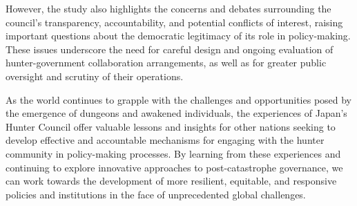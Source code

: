 \documentclass[12pt, a4paper]{article}
\begin{document}
However, the study also highlights the concerns and debates surrounding the council's transparency, accountability, and potential conflicts of interest, raising important questions about the democratic legitimacy of its role in policy-making. These issues underscore the need for careful design and ongoing evaluation of hunter-government collaboration arrangements, as well as for greater public oversight and scrutiny of their operations.

As the world continues to grapple with the challenges and opportunities posed by the emergence of dungeons and awakened individuals, the experiences of Japan's Hunter Council offer valuable lessons and insights for other nations seeking to develop effective and accountable mechanisms for engaging with the hunter community in policy-making processes. By learning from these experiences and continuing to explore innovative approaches to post-catastrophe governance, we can work towards the development of more resilient, equitable, and responsive policies and institutions in the face of unprecedented global challenges.



\end{document}
